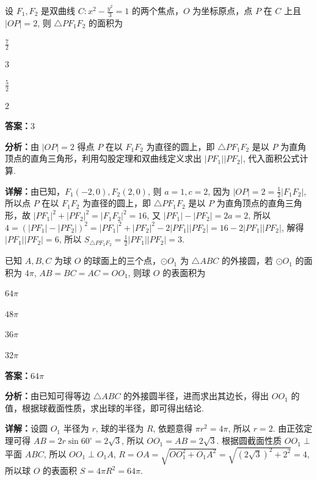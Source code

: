 \begin{question}[points=5]
设 $F_1, F_2$ 是双曲线 $C: x^2 - \frac{y^2}{3} = 1$ 的两个焦点，$O$ 为坐标原点，点 $P$ 在 $C$ 上且 $|OP| = 2$, 则 $\triangle PF_1F_2$ 的面积为
\begin{choices}
  \item $\frac{7}{2}$
  \item $3$
  \item $\frac{5}{2}$
  \item $2$
\end{choices}
\begin{solution}
\textbf{答案：}$3$

\textbf{分析：}由 $|OP| = 2$ 得点 $P$ 在以 $F_1F_2$ 为直径的圆上，即 $\triangle PF_1F_2$ 是以 $P$ 为直角顶点的直角三角形，利用勾股定理和双曲线定义求出 $|PF_1||PF_2|$, 代入面积公式计算.

\textbf{详解：}由已知，$F_1(-2,0), F_2(2,0)$, 则 $a=1, c=2$, 因为 $|OP|=2 = \frac{1}{2}|F_1F_2|$, 所以点 $P$ 在以 $F_1F_2$ 为直径的圆上，即 $\triangle PF_1F_2$ 是以 $P$ 为直角顶点的直角三角形，故 $|PF_1|^2 + |PF_2|^2 = |F_1F_2|^2 = 16$, 又 $|PF_1|-|PF_2|=2a=2$, 所以 $4 = (|PF_1|-|PF_2|)^2 = |PF_1|^2 + |PF_2|^2 - 2|PF_1||PF_2| = 16 - 2|PF_1||PF_2|$, 解得 $|PF_1||PF_2|=6$, 所以 $S_{\triangle PF_1F_2} = \frac{1}{2}|PF_1||PF_2|=3$.
\end{solution}
\end{question}

\begin{question}[points=5]
已知 $A, B, C$ 为球 $O$ 的球面上的三个点，$\odot O_1$ 为 $\triangle ABC$ 的外接圆，若 $\odot O_1$ 的面积为 $4\pi$, $AB = BC = AC = OO_1$, 则球 $O$ 的表面积为
\begin{choices}
  \item $64\pi$
  \item $48\pi$
  \item $36\pi$
  \item $32\pi$
\end{choices}
\begin{solution}
\textbf{答案：}$64\pi$

\textbf{分析：}由已知可得等边 $\triangle ABC$ 的外接圆半径，进而求出其边长，得出 $OO_1$ 的值，根据球截面性质，求出球的半径，即可得出结论.

\textbf{详解：}设圆 $O_1$ 半径为 $r$, 球的半径为 $R$, 依题意得 $\pi r^2 = 4\pi$, 所以 $r=2$. 由正弦定理可得 $AB = 2r\sin 60^\circ = 2\sqrt{3}$, 所以 $OO_1 = AB = 2\sqrt{3}$. 根据圆截面性质 $OO_1 \perp$ 平面 $ABC$, 所以 $OO_1 \perp O_1A$, $R = OA = \sqrt{OO_1^2 + O_1A^2} = \sqrt{(2\sqrt{3})^2 + 2^2} = 4$, 所以球 $O$ 的表面积 $S = 4\pi R^2 = 64\pi$.
\end{solution}
\end{question}


